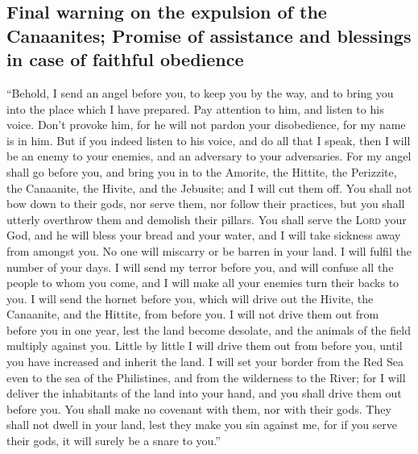 \hypertarget{final-warning-on-the-expulsion-of-the-canaanites-promise-of-assistance-and-blessings-in-case-of-faithful-obedience}{%
\subsection{Final warning on the expulsion of the Canaanites; Promise of
assistance and blessings in case of faithful
obedience}\label{final-warning-on-the-expulsion-of-the-canaanites-promise-of-assistance-and-blessings-in-case-of-faithful-obedience}}

 ``Behold, I send an angel before you, to keep you by the
way, and to bring you into the place which I have prepared.
 Pay attention to him, and listen to his voice. Don't
provoke him, for he will not pardon your disobedience, for my name is in
him.  But if you indeed listen to his voice, and do all
that I speak, then I will be an enemy to your enemies, and an adversary
to your adversaries.  For my angel shall go before you,
and bring you in to the Amorite, the Hittite, the Perizzite, the
Canaanite, the Hivite, and the Jebusite; and I will cut them off.
 You shall not bow down to their gods, nor serve them,
nor follow their practices, but you shall utterly overthrow them and
demolish their pillars.  You shall serve the
\textsc{Lord} your God, and he will bless your bread and your water, and
I will take sickness away from amongst you.  No one will
miscarry or be barren in your land. I will fulfil the number of your
days.  I will send my terror before you, and will confuse
all the people to whom you come, and I will make all your enemies turn
their backs to you.  I will send the hornet before you,
which will drive out the Hivite, the Canaanite, and the Hittite, from
before you.  I will not drive them out from before you in
one year, lest the land become desolate, and the animals of the field
multiply against you.  Little by little I will drive them
out from before you, until you have increased and inherit the land.
 I will set your border from the Red Sea even to the sea
of the Philistines, and from the wilderness to the River; for I will
deliver the inhabitants of the land into your hand, and you shall drive
them out before you.  You shall make no covenant with
them, nor with their gods.  They shall not dwell in your
land, lest they make you sin against me, for if you serve their gods, it
will surely be a snare to you.''

